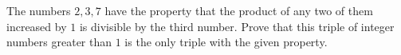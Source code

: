 The numbers $2,3,7$ have the property that the product of any two of them increased by $1$ is divisible by the third number. Prove that this triple of integer numbers greater than $1$ is the only triple with the given property.